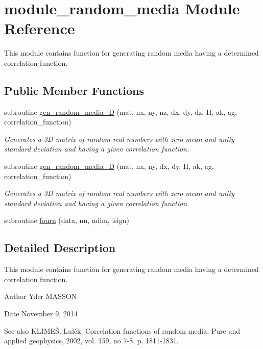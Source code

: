 \hypertarget{classmodule__random__media}{
\section{module\-\_\-random\-\_\-media \-Module \-Reference}
\label{classmodule__random__media}
}


\-This module contains function for generating random media having a determined correlation function.  


\subsection*{\-Public \-Member \-Functions}
\begin{DoxyCompactItemize}
\item 
subroutine \hyperlink{classmodule__random__media_a20add11a88ee91f087cddbfb6554f08b}{gen\-\_\-random\-\_\-media\-\_\-D} (mat, nx, ny, nz, dx, dy, dz, \-H, ak, ag, correlation\-\_\-function)
\begin{DoxyCompactList}\small\item\em \-Generates a 3\-D matrix of random real numbers with zero mean and unity standard deviation and having a given correlation function. \end{DoxyCompactList}\item 
subroutine \hyperlink{classmodule__random__media_aa23f1e2861b1a505d3d7545e54337bab}{gen\-\_\-random\-\_\-media\-\_\-D} (mat, nx, ny, dx, dy, \-H, ak, ag, correlation\-\_\-function)
\begin{DoxyCompactList}\small\item\em \-Generates a 3\-D matrix of random real numbers with zero mean and unity standard deviation and having a given correlation function. \end{DoxyCompactList}\item 
subroutine \hyperlink{classmodule__random__media_acca655a7647ef0bd11dc4365dbd2557e}{fourn} (data, nn, ndim, isign)
\end{DoxyCompactItemize}


\subsection{\-Detailed \-Description}
\-This module contains function for generating random media having a determined correlation function. 

\begin{DoxyAuthor}{\-Author}
\-Yder \-M\-A\-S\-S\-O\-N 
\end{DoxyAuthor}
\begin{DoxyDate}{\-Date}
\-November 9, 2014 
\end{DoxyDate}
\begin{DoxySeeAlso}{\-See also}
\-K\-L\-I\-M\-EŠ, \-Lulěk. \-Correlation functions of random media. \-Pure and applied geophysics, 2002, vol. 159, no 7-\/8, p. 1811-\/1831. 
\end{DoxySeeAlso}


